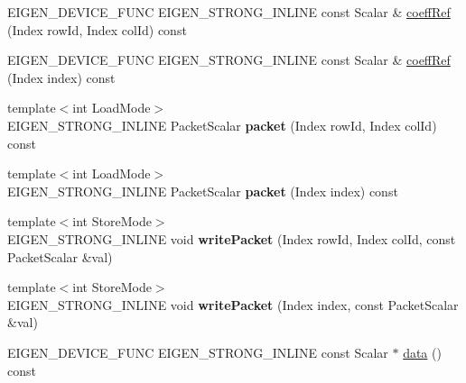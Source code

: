 \begin{DoxyCompactItemize}
\item 
E\+I\+G\+E\+N\+\_\+\+D\+E\+V\+I\+C\+E\+\_\+\+F\+U\+NC E\+I\+G\+E\+N\+\_\+\+S\+T\+R\+O\+N\+G\+\_\+\+I\+N\+L\+I\+NE const Scalar \& \mbox{\hyperlink{class_eigen_1_1_plain_object_base_ab1b33ee10e4c72ec5cf354d511900e62}{coeff\+Ref}} (Index row\+Id, Index col\+Id) const
\item 
E\+I\+G\+E\+N\+\_\+\+D\+E\+V\+I\+C\+E\+\_\+\+F\+U\+NC E\+I\+G\+E\+N\+\_\+\+S\+T\+R\+O\+N\+G\+\_\+\+I\+N\+L\+I\+NE const Scalar \& \mbox{\hyperlink{class_eigen_1_1_plain_object_base_a982b56223d011e2f836a3408983883d4}{coeff\+Ref}} (Index index) const
\item 
\mbox{\label{class_eigen_1_1_plain_object_base_a85d505b93c18f4f558e9b80702e8e5af}} 
{\footnotesize template$<$int Load\+Mode$>$ }\\E\+I\+G\+E\+N\+\_\+\+S\+T\+R\+O\+N\+G\+\_\+\+I\+N\+L\+I\+NE Packet\+Scalar {\bfseries packet} (Index row\+Id, Index col\+Id) const
\item 
\mbox{\label{class_eigen_1_1_plain_object_base_afdf71b005e354b8407b53dfd8aa7add2}} 
{\footnotesize template$<$int Load\+Mode$>$ }\\E\+I\+G\+E\+N\+\_\+\+S\+T\+R\+O\+N\+G\+\_\+\+I\+N\+L\+I\+NE Packet\+Scalar {\bfseries packet} (Index index) const
\item 
\mbox{\label{class_eigen_1_1_plain_object_base_adb237a2cdcb37c6901ad15c7a9d87b1a}} 
{\footnotesize template$<$int Store\+Mode$>$ }\\E\+I\+G\+E\+N\+\_\+\+S\+T\+R\+O\+N\+G\+\_\+\+I\+N\+L\+I\+NE void {\bfseries write\+Packet} (Index row\+Id, Index col\+Id, const Packet\+Scalar \&val)
\item 
\mbox{\label{class_eigen_1_1_plain_object_base_acda1c761dd92774f7835a0c661f2ef54}} 
{\footnotesize template$<$int Store\+Mode$>$ }\\E\+I\+G\+E\+N\+\_\+\+S\+T\+R\+O\+N\+G\+\_\+\+I\+N\+L\+I\+NE void {\bfseries write\+Packet} (Index index, const Packet\+Scalar \&val)
\item 
E\+I\+G\+E\+N\+\_\+\+D\+E\+V\+I\+C\+E\+\_\+\+F\+U\+NC E\+I\+G\+E\+N\+\_\+\+S\+T\+R\+O\+N\+G\+\_\+\+I\+N\+L\+I\+NE const Scalar $\ast$ \mbox{\hyperlink{class_eigen_1_1_plain_object_base_ac25699535374b1854cf8494e44ad31b2}{data}} () const

\end{DoxyCompactItemize}
